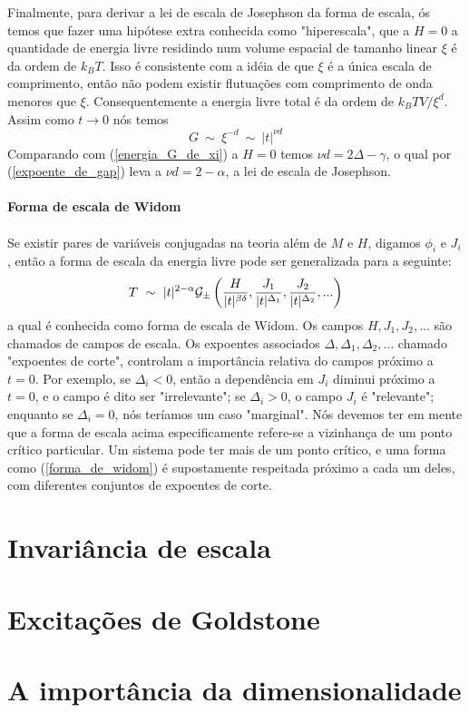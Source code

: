 Finalmente, para derivar a lei de escala de Josephson da forma de escala, ós temos que fazer uma hipótese extra conhecida como "hiperescala", que a $H=0$ a quantidade de energia livre residindo num volume espacial de tamanho linear $\xi$ é da ordem de $k_{B}T$. Isso é consistente com a idéia de que $\xi$ é a única escala de comprimento, então não podem existir flutuações com comprimento de onda menores que $\xi$. Consequentemente a energia livre total é da ordem de $k_{B}TV/\xi^{d}$. Assim como $t \rightarrow 0$ nós temos
\begin{equation}
G~\sim~\xi^{-d}~\sim~|t|^{\nu d}
\end{equation}
Comparando com (\ref{energia_G_de_xi}) a $H=0$ temos $\nu d=2\Delta-\gamma$, o qual por (\ref{expoente_de_gap}) leva a $\nu d=2-\alpha$, a lei de escala de Josephson.\\
\\
\noindent
{\bf Forma de escala de Widom}\\
\\
Se existir pares de variáveis conjugadas na teoria além de $M$ e $H$, digamos $\phi_{i}$ e $J_{i}$, então a forma de escala da energia livre pode ser generalizada para a seguinte:
\begin{equation}
T~\sim~|t|^{2-\alpha}{\cal G}_{\pm}\left(\frac{H}{|t|^{\beta \delta}},\frac{J_{1}}{|t|^{\Delta_{1}}},\frac{J_{2}}{|t|^{\Delta_{2}}},... \right)
\label{forma_de_widom}
\end{equation}
a qual é conhecida como forma de escala de Widom. Os campos $H,J_{1},J_{2},...$ são chamados de campos de escala. Os expoentes associados $\Delta,\Delta_{1},\Delta_{2},...$ chamado "expoentes de corte", controlam a importância relativa do campos próximo a $t=0$. Por exemplo, se $\Delta_{i}<0$, então a dependência em $J_{i}$ diminui próximo a $t=0$, e o campo é dito ser "irrelevante"; se $\Delta_{i}>0$, o campo $J_{i}$ é "relevante"; enquanto se $\Delta_{i}=0$, nós teríamos um caso "marginal". Nós devemos ter em mente que a forma de escala acima especificamente refere-se a vizinhança de um ponto crítico particular. Um sistema pode ter mais de um ponto crítico, e uma forma como (\ref{forma_de_widom}) é supostamente respeitada próximo a cada um deles, com diferentes conjuntos de expoentes de corte.

\section{Invariância de escala}
\noindent

\section{Excitações de Goldstone}
\noindent

\section{A importância da dimensionalidade}
\noindent